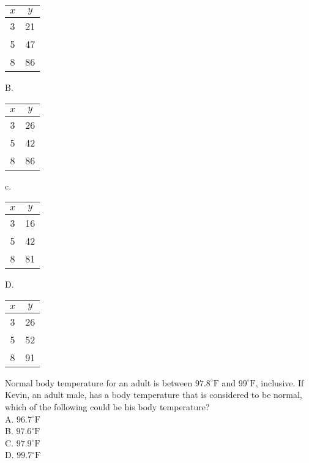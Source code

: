 \begin{center}
\begin{tabular}{|c|c|}
\hline
$x$ & $y$ \\
\hline
3 & 21 \\
\hline
5 & 47 \\
\hline
8 & 86 \\
\hline
\end{tabular}
\end{center}

B.

\begin{center}
\begin{tabular}{|c|c|}
\hline
$x$ & $y$ \\
\hline
3 & 26 \\
\hline
5 & 42 \\
\hline
8 & 86 \\
\hline
\end{tabular}
\end{center}

c.

\begin{center}
\begin{tabular}{|c|c|}
\hline
$x$ & $y$ \\
\hline
3 & 16 \\
\hline
5 & 42 \\
\hline
8 & 81 \\
\hline
\end{tabular}
\end{center}

D.

\begin{center}
\begin{tabular}{|c|c|}
\hline
$x$ & $y$ \\
\hline
3 & 26 \\
\hline
5 & 52 \\
\hline
8 & 91 \\
\hline
\end{tabular}
\end{center}

Normal body temperature for an adult is between $97.8^{\circ} \mathrm{F}$ and $99^{\circ} \mathrm{F}$, inclusive. If\\
Kevin, an adult male, has a body temperature that is considered to be normal, which of the following could be his body temperature?\\
A. $96.7^{\circ} \mathrm{F}$\\
B. $97.6^{\circ} \mathrm{F}$\\
C. $97.9^{\circ} \mathrm{F}$\\
D. $99.7^{\circ} \mathrm{F}$

